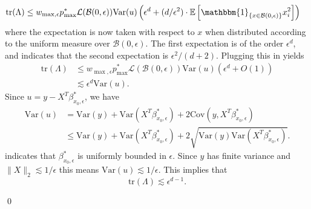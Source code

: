 \documentclass[11pt]{article}
\begin{document}
\begin{align*}
    \text{tr}(\Lambda) &\leq w_{\max, \epsilon} p^*_{\max}\mathcal{L}(\mathcal{B}(0, \epsilon))\text{Var}(u)\left(\epsilon^d + (d/\epsilon^2) \cdot \mathbb{E}\left[\mathbbm{1}_{\{x \in \mathcal{B}(0, \epsilon)\}} x_i^2\right]\right)
\end{align*}
where the expectation is now taken with respect to $x$ when distributed according to the uniform measure over $\mathcal{B}(0, \epsilon)$. The first expectation is of the order $\epsilon^d$, and  indicates that the second expectation is $\epsilon^2/(d+2)$. Plugging this in yields
\begin{align*}
    \text{tr}(\Lambda) &\leq w_{\max, \epsilon} p^*_{\max}\mathcal{L}(\mathcal{B}(0, \epsilon))\text{Var}(u)\left(\epsilon^d + O(1)\right) \\
    &\lesssim \epsilon^{d}\text{Var}(u).
\end{align*}
Since $u = y - X^T\beta^*_{x_0, \epsilon}$, we have
\begin{align*}
    \text{Var}(u) &= \text{Var}(y) + \text{Var}(X^T\beta^*_{x_0, \epsilon}) + 2\text{Cov}(y, X^T\beta^*_{x_0, \epsilon}) \\
    &\leq \text{Var}(y) + \text{Var}(X^T\beta^*_{x_0, \epsilon}) + 2 \sqrt{\text{Var}(y) \text{Var}(X^T\beta^*_{x_0, \epsilon})}.
\end{align*}
 indicates that $\beta^*_{x_0, \epsilon}$ is uniformly bounded in $\epsilon$. Since $y$ has finite variance and $\|X\|_2 \lesssim 1/\epsilon$ this means $\text{Var}(u) \lesssim 1/\epsilon$. This implies that 
\[\text{tr}(\Lambda) \lesssim \epsilon^{d-1}.\]

\qed{}
\end{document}
